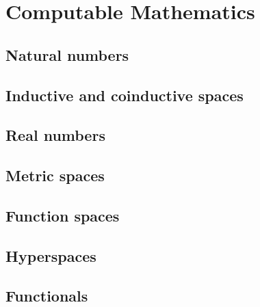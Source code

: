 \chapter{Computable Mathematics}
\label{chap:computable-mathematics}

\section{Natural numbers}
\label{sec:natural-numbers}

\section{Inductive and coinductive spaces}
\label{sec:inductive-coinductive}


\section{Real numbers}
\label{sec:real-numbers}

\section{Metric spaces}
\label{sec:metric-spaces}


\section{Function spaces}
\label{sec:function-spaces}


\section{Hyperspaces}
\label{sec:hyperspaces}


\section{Functionals}
\label{sec:functionals}



